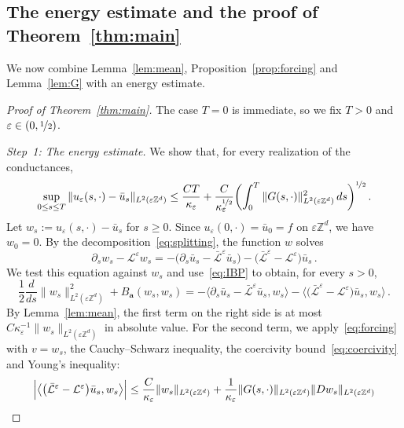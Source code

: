 \documentclass[11pt]{amsart}
\numberwithin{equation}{section}
\newcommand{\Z}{\mathbb{Z}}
\newcommand{\ba}{\mathbf{a}}
\newcommand{\eps}{\varepsilon}
\newcommand{\Leps}{\mathcal{L}^\varepsilon}
\newcommand{\Lbar}{\bar{\mathcal{L}}^\varepsilon}
\newcommand{\nf}{\nicefrac}
\begin{document}
\subsection{The energy estimate and the proof of Theorem~\ref{thm:main}} \label{sec:energy}

We now combine Lemma~\ref{lem:mean}, Proposition~\ref{prop:forcing} and Lemma~\ref{lem:G} with an energy estimate.

\begin{proof}[Proof of Theorem~\ref{thm:main}]
The case $T = 0$ is immediate, so we fix $T > 0$ and $\eps \in (0, \nf12)$.

\smallskip

\emph{Step~1: The energy estimate.}
We show that, for every realization of the conductances,
\begin{equation} \label{eq:final.deterministic}
    \sup_{0 \leq s \leq T} \|u_\eps(s, \cdot) - \bar u_s\|_{L^2(\eps \Z^d)} \leq \frac{C T}{\kappa_\eps} + \frac{C}{\kappa_\eps^{\nf12}} \biggl( \int_0^T \|G(s, \cdot)\|_{L^2(\eps \Z^d)}^2 \,ds \biggr)^{\nf12}\,.
\end{equation}
Let $w_s := u_\eps(s, \cdot) - \bar u_s$ for $s \geq 0$.
Since $u_\eps(0, \cdot) = \bar u_0 = f$ on $\eps \Z^d$, we have $w_0 = 0$.
By the decomposition~\eqref{eq:splitting}, the function $w$ solves
\begin{equation*}
    \partial_s w_s - \Leps w_s = - \bigl( \partial_s \bar u_s - \Lbar \bar u_s \bigr) - \bigl( \Lbar - \Leps \bigr) \bar u_s\,.
\end{equation*}
We test this equation against $w_s$ and use~\eqref{eq:IBP} to obtain, for every $s > 0$,
\begin{equation*}
    \frac12 \frac{d}{ds} \|w_s\|_{L^2(\eps \Z^d)}^2 + B_\ba(w_s, w_s) = - \bigl\langle \partial_s \bar u_s - \Lbar \bar u_s, w_s \bigr\rangle - \bigl\langle \bigl( \Lbar - \Leps \bigr) \bar u_s, w_s \bigr\rangle\,.
\end{equation*}
By Lemma~\ref{lem:mean}, the first term on the right side is at most $C \kappa_\eps^{-1} \|w_s\|_{L^2(\eps \Z^d)}$ in absolute value.
For the second term, we apply~\eqref{eq:forcing} with $v = w_s$, the Cauchy--Schwarz inequality, the coercivity bound~\eqref{eq:coercivity} and Young's inequality:
\begin{align*}
    \Bigl| \bigl\langle \bigl( \Lbar - \Leps \bigr) \bar u_s, w_s \bigr\rangle \Bigr|
    & \leq \frac{C}{\kappa_\eps} \|w_s\|_{L^2(\eps \Z^d)} + \frac{1}{\kappa_\eps} \|G(s, \cdot)\|_{L^2(\eps \Z^d)} \|D w_s\|_{L^2(\eps \Z^d)} \\

\end{align*}
\end{proof}
\end{document}
